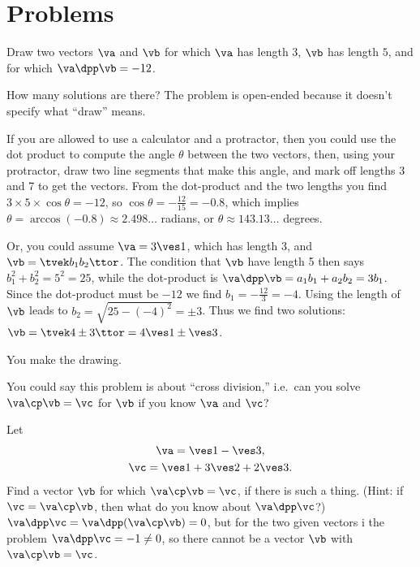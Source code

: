 \section{Problems} %
\problemfont
\begin{multicols}{2}
\problem Draw two vectors $\va$ and $\vb$ for which %
$\va$ has length 3, $\vb$ has length $5$, and for which $\va\dpp\vb=-12$.

How many solutions are there?%
\answer %
The problem is open-ended because it doesn't specify what ``draw'' means.

If you are allowed to use a calculator and a protractor, then you could use the
dot product to compute the angle $\theta$ between the two vectors, then, using
your protractor, draw two line segments that make this angle, and mark off
lengths 3 and 7 to get the vectors.  From the dot-product and the two lengths
you find $3\times5\times\cos\theta = -12$, so $\cos\theta = - \frac{12}{15}=
-0.8$, which implies $\theta = \arccos (-0.8) \approx 2.498\dots$ radians, or
$\theta\approx 143.13\dots$ degrees.

Or, you could assume $\va=3\ves1$, which has length 3, and $\vb=\tvek
b_1\\b_2\ttor$.  The condition that $\vb$ have length 5 then says
$b_1^2 + b_2^2 = 5^2 = 25$, while the dot-product is $\va\dpp\vb = a_1b_1+a_2b_2
= 3b_1$.  Since the dot-product must be $-12$ we find $b_1=-\frac{12}{3}=-4$.
Using the length of $\vb$ leads to $b_2=\sqrt{25-(-4)^2} = \pm3$.  Thus we find
two solutions: $\vb = \tvek 4\\ \pm3\ttor = 4\ves1\pm\ves3$.

You make the drawing.
\endanswer

\problem %
You could say this problem is about ``cross division,'' i.e.~can you solve
$\va\cp\vb=\vc$ for $\vb$ if you know $\va$ and $\vc$?

\subprob Let %
\begin{gather*}
  \va =\ves1-\ves3,\\
  \vc = \ves1+3\ves2+2\ves3.
\end{gather*}
Find a vector $\vb$ for which $\va\cp\vb=\vc$, if there is such a thing.  (Hint:
if $\vc=\va\cp\vb$, then what do you know about $\va\dpp\vc$?)
\answer%
$\va\dpp\vc=\va\dpp(\va\cp\vb) =0$, but for the two given vectors i the problem
$\va\dpp\vc = -1\neq0$, so there cannot be a vector $\vb$ with $\va\cp\vb=\vc$.
\endanswer


\end{multicols}
